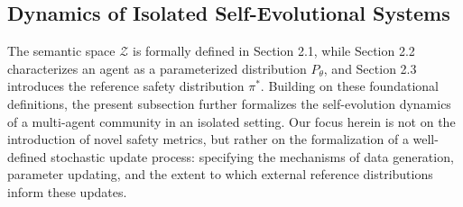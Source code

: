


\subsection{Dynamics of Isolated Self-Evolutional Systems}\label{sec:2-4-isolated-recursive-dynamics}

The semantic space $\mathcal{Z}$ is formally defined in Section 2.1, while Section 2.2 characterizes an agent as a parameterized distribution $P_\theta$, and Section 2.3 introduces the reference safety distribution $\pi^\ast$. Building on these foundational definitions, the present subsection further formalizes the self-evolution dynamics of a multi-agent community in an isolated setting. Our focus herein is not on the introduction of novel safety metrics, but rather on the formalization of a well-defined stochastic update process: specifying the mechanisms of data generation, parameter updating, and the extent to which external reference distributions inform these updates.

